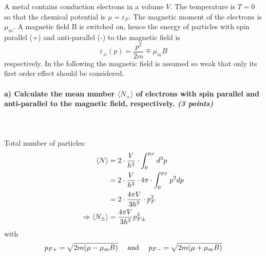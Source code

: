 A metal contains conduction electrons in a volume $V$. 
The temperature is $T=0$ so that the chemical potential is 
$\mu=\varepsilon_F$. The magnetic moment of the electrons 
is $\mu_m$. A magnetic field B is switched on, hence the 
energy of particles with spin parallel (+) and anti-parallel 
(-) to the magnetic field is
\begin{equation}
    \varepsilon_\pm(p)=\frac{p^2}{2m}\mp\mu_mB
\end{equation}
respectively. In the following the magnetic field is assumed 
so weak that only its first order effect should be considered.

\paragraph{a) Calculate the mean number $\langle N_\pm\rangle$ 
    of electrons with spin parallel and anti-parallel to the 
    magnetic field, respectively. \textit{(3 points)}
} \ \\
    \\
    Total number of particles:
    \begin{align}
        \langle N\rangle
        &=2\cdot\frac{V}{h^3}\cdot\int_0^{p_F}d^3p \\
        &=2\cdot\frac{V}{h^3}\cdot4\pi\cdot\int_0^{p_F}p^2dp \\
        &=2\cdot\frac{4\pi V}{3h^3}\cdot p_F^3 \\
        \Rightarrow \langle N_\pm \rangle
        &=\frac{4\pi V}{3h^3}p^3_{F\pm}
    \end{align}
    with
    \begin{align}
        p_{F+}=\sqrt{
            2m(\mu-\mu_mB)
        }
        \ \ \ \ \textnormal{and}\ \ \ \
        p_{F-}=\sqrt{
            2m(\mu+\mu_mB)
        }
    \end{align}


